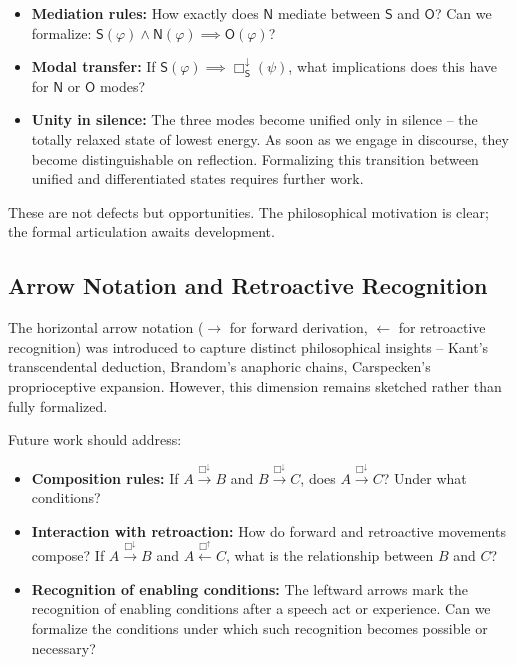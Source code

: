 \documentclass[12pt]{book}
\begin{document}
\begin{itemize}
\item \textbf{Mediation rules:} How exactly does $\mathsf{N}$ mediate between $\mathsf{S}$ and $\mathsf{O}$? Can we formalize: $\mathsf{S}(\varphi) \wedge \mathsf{N}(\varphi) \implies \mathsf{O}(\varphi)$?

\item \textbf{Modal transfer:} If $\mathsf{S}(\varphi) \implies \Box_{\mathsf{S}}^{\downarrow}(\psi)$, what implications does this have for $\mathsf{N}$ or $\mathsf{O}$ modes?

\item \textbf{Unity in silence:} The three modes become unified only in silence -- the totally relaxed state of lowest energy. As soon as we engage in discourse, they become distinguishable on reflection. Formalizing this transition between unified and differentiated states requires further work.
\end{itemize}

These are not defects but opportunities. The philosophical motivation is clear; the formal articulation awaits development.

\subsection{Arrow Notation and Retroactive Recognition}

The horizontal arrow notation ($\rightarrow$ for forward derivation, $\leftarrow$ for retroactive recognition) was introduced to capture distinct philosophical insights -- Kant's transcendental deduction, Brandom's anaphoric chains, Carspecken's proprioceptive expansion. However, this dimension remains sketched rather than fully formalized.

Future work should address:
\begin{itemize}
\item \textbf{Composition rules:} If $A \xrightarrow{\Box^{\downarrow}} B$ and $B \xrightarrow{\Box^{\downarrow}} C$, does $A \xrightarrow{\Box^{\downarrow}} C$? Under what conditions?

\item \textbf{Interaction with retroaction:} How do forward and retroactive movements compose? If $A \xrightarrow{\Box^{\downarrow}} B$ and $A \xleftarrow{\Box^{\uparrow}} C$, what is the relationship between $B$ and $C$?

\item \textbf{Recognition of enabling conditions:} The leftward arrows mark the recognition of enabling conditions after a speech act or experience. Can we formalize the conditions under which such recognition becomes possible or necessary?
\end{itemize}
\end{document}
